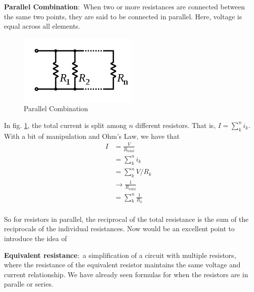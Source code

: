 \documentclass[nobib]{tufte-handout}
\newcommand{\defn}[2]{\noindent\textbf{#1}:\ #2}
\begin{document}
\defn{Parallel Combination}{When two or more resistances are 
connected between the same two points, they are said to be 
connected in parallel. Here, voltage is equal
across all elements}. 
\begin{figure}
    \center
    \includegraphics[width=\textwidth/2]{images/220px-Resistors_in_parallel.svg.png}
    \caption{Parallel Combination}
    \label{fig:parallel}
\end{figure}
In fig. \ref{fig:parallel}, the total current is split among
$n$ different resistors. That is, $I = \sum_k^n i_k$. With a bit of
manipulation and Ohm's Law, we have that
\begin{align*}
    I &= \frac{V}{R_{total}}\\
    &= \sum_k^n i_k \\
    &= \sum_k^n V/R_k \\
    &\rightarrow \frac{1}{R_{total}} \\
    &= \sum_k^n \frac{1}{R_k} \\
\end{align*}

So for resistors in parallel, the reciprocal of the total resistance is 
the sum of the reciprocals of the individual resistances. Now would
be an excellent point to introduce the idea of 

\defn{Equivalent resistance}{a simplification
of a circuit with multiple resistors, where the resistance
of the equivalent resistor maintains the same voltage 
and current relationship.} We have already seen formulas
for when the resistors are in paralle or series. 
\end{document}
